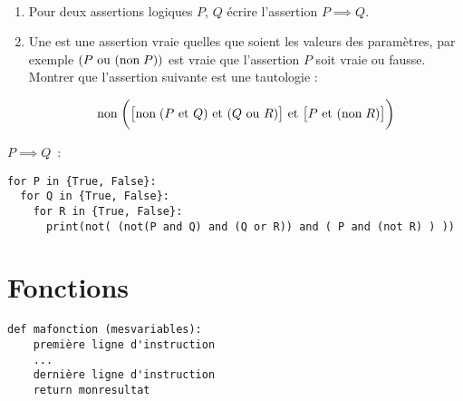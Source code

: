 \begin{frame}[fragile]
\begin{tp}~
\begin{enumerate}
  \item Pour deux assertions logiques $P$, $Q$ écrire l'assertion $P\implies Q$.
  
  \item Une  est une assertion vraie quelles que soient les valeurs des paramètres,
  par exemple $(P \text{ ou } (\text{non\;} P))$ est vraie que l'assertion $P$ soit vraie ou fausse.
  Montrer que l'assertion suivante est une tautologie :
  
  \vspace*{-2ex}
  $$\text{non\;} \bigg( \big[\text{non\;}(P \text{ et } Q)  \text{ et } (Q \text{ ou } R) \big] 
  \text{ et } \big[P \text{ et } (\text{non\;} R)\big] \bigg)$$
\end{enumerate}
  
\end{tp}

\pause
\smallskip

\og$P\implies Q$\fg\ : 

\pause

{\footnotesize
\begin{algo}
\begin{lstlisting}
for P in {True, False}:
  for Q in {True, False}:
    for R in {True, False}:
      print(not( (not(P and Q) and (Q or R)) and ( P and (not R) ) ))
\end{lstlisting}
\end{algo}
}

\end{frame}




\section{Fonctions}


\begin{frame}[fragile]



\medskip
\pause


\begin{algo}
\begin{lstlisting}
def mafonction (mesvariables):
    première ligne d'instruction
    ...
    dernière ligne d'instruction    
    return monresultat
\end{lstlisting}
\end{algo}

\end{frame}


